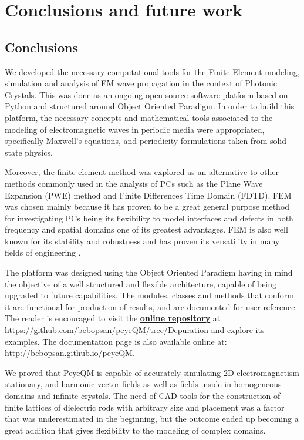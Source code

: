 \chapter{Conclusions and future work}

\section{Conclusions}

We developed the necessary computational tools for the Finite Element modeling, simulation and analysis of EM wave propagation in the context of Photonic Crystals.  This was done as an ongoing open source software platform based on Python and structured around Object Oriented Paradigm. 
In order to build this platform, the necessary concepts and mathematical tools associated to the modeling of electromagnetic waves in periodic media were appropriated, specifically Maxwell's equations, and periodicity formulations taken from solid state physics. 

Moreover, the finite element method was explored as an alternative to other methods commonly used in the analysis of PCs such as the Plane Wave Expansion (PWE) \cite{StevenJohnson2001} method\add[SEC]{,} and Finite Differences Time Domain (FDTD)\cite{Oskooi2009}. FEM was chosen mainly because it has proven to be a great general purpose method for investigating PCs \cite{Andonegui2013} being its flexibility to model interfaces and defects in both frequency and spatial domains one of its greatest advantages. FEM is also well known for its stability and robustness and has proven its versatility in many fields of engineering \cite{Bathe1996, Ram2002, Zienkiewicz2005, Logg2012}.

The platform was designed using the Object Oriented Paradigm having in mind the objective of  a well structured and flexible architecture, capable of being upgraded to future capabilities.  The modules, classes and methods that conform it are functional for production of results, and are documented for user reference. The reader is encouraged to visit the \href{https://github.com/bebopsan/peyeQM/tree/Depuration}{\textbf{online repository}} at \url{https://github.com/bebopsan/peyeQM/tree/Depuration} and explore its examples. The documentation page is also available online at: \url{http://bebopsan.github.io/peyeQM}.

We proved that PeyeQM is capable of accurately simulating  2D electromagnetism stationary, and harmonic vector fields as well as fields inside in-homogeneous domains and infinite crystals. The need of CAD tools for the construction of finite lattices of dielectric rods with arbitrary size and placement was a factor that was underestimated in the beginning, but the outcome ended up becoming a great addition that gives flexibility to the modeling of complex domains.

